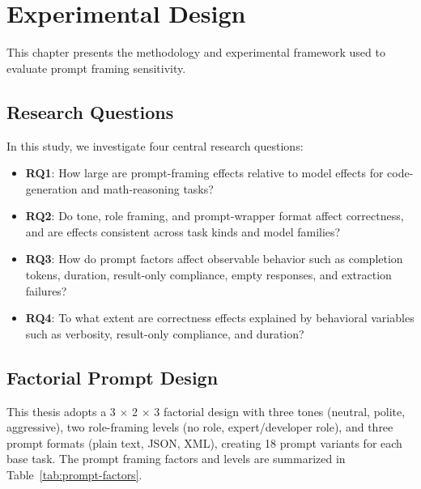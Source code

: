 \chapter{Experimental Design\label{cha:chapter3}}

This chapter presents the methodology and experimental framework used to evaluate prompt framing sensitivity.

\section{Research Questions\label{sec:research-questions}}

In this study, we investigate four central research questions:

\begin{itemize}
\tightlist
\item
 \textbf{RQ1}: How large are prompt-framing effects relative to model effects for code-generation and math-reasoning tasks?
\item
 \textbf{RQ2}: Do tone, role framing, and prompt-wrapper format affect correctness, and are effects consistent across task kinds and model families?
\item
 \textbf{RQ3}: How do prompt factors affect observable behavior such as completion tokens, duration, result-only compliance, empty responses, and extraction failures?
\item
 \textbf{RQ4}: To what extent are correctness effects explained by behavioral variables such as verbosity, result-only compliance, and duration?
\end{itemize}

\section{Factorial Prompt Design\label{sec:factorial-prompt-design}}

This thesis adopts a 3 $\times$ 2 $\times$ 3 factorial design with three tones (neutral, polite, aggressive), two role-framing levels (no role, expert/developer role), and three prompt formats (plain text, JSON, XML), creating 18 prompt variants for each base task. The prompt framing factors and levels are summarized in Table~\ref{tab:prompt-factors}.

